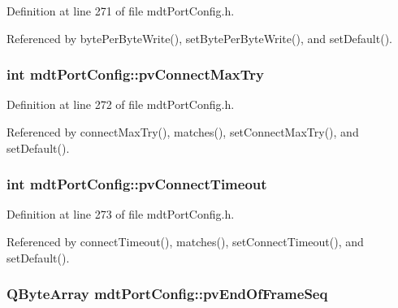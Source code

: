 Definition at line 271 of file mdt\-Port\-Config.\-h.



Referenced by byte\-Per\-Byte\-Write(), set\-Byte\-Per\-Byte\-Write(), and set\-Default().

\hypertarget{classmdt_port_config_a46b87d1b9c2dbe30688497c34807d93c}{
\subsubsection[{pv\-Connect\-Max\-Try}]{\setlength{\rightskip}{0pt plus 5cm}int mdt\-Port\-Config\-::pv\-Connect\-Max\-Try\hspace{0.3cm}{\ttfamily [protected]}}}\label{classmdt_port_config_a46b87d1b9c2dbe30688497c34807d93c}


Definition at line 272 of file mdt\-Port\-Config.\-h.



Referenced by connect\-Max\-Try(), matches(), set\-Connect\-Max\-Try(), and set\-Default().

\hypertarget{classmdt_port_config_a3e6aa49486e716f834e174b5ce0a3909}{
\subsubsection[{pv\-Connect\-Timeout}]{\setlength{\rightskip}{0pt plus 5cm}int mdt\-Port\-Config\-::pv\-Connect\-Timeout\hspace{0.3cm}{\ttfamily [protected]}}}\label{classmdt_port_config_a3e6aa49486e716f834e174b5ce0a3909}


Definition at line 273 of file mdt\-Port\-Config.\-h.



Referenced by connect\-Timeout(), matches(), set\-Connect\-Timeout(), and set\-Default().

\hypertarget{classmdt_port_config_ad5d5aeb26cfe98090848a62f5078b22c}{
\subsubsection[{pv\-End\-Of\-Frame\-Seq}]{\setlength{\rightskip}{0pt plus 5cm}Q\-Byte\-Array mdt\-Port\-Config\-::pv\-End\-Of\-Frame\-Seq\hspace{0.3cm}{\ttfamily [protected]}}}\label{classmdt_port_config_ad5d5aeb26cfe98090848a62f5078b22c}


